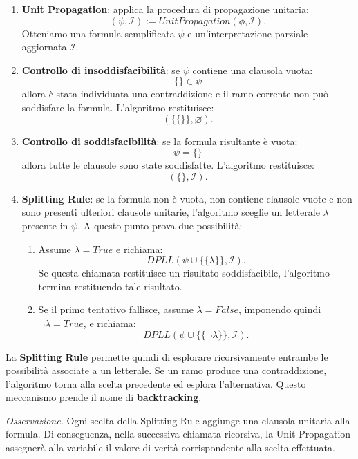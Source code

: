 \begin{enumerate}
    \item \textbf{Unit Propagation}: applica la procedura di propagazione unitaria:
    \[
    (\psi,\mathcal I):=
    UnitPropagation(\phi,\mathcal I).
    \]
    Otteniamo una formula semplificata $\psi$
    e un'interpretazione parziale aggiornata
    $\mathcal I$.

    \item \textbf{Controllo di insoddisfacibilità}: se $\psi$ contiene una clausola vuota:
    \[
    \{\}\in\psi
    \]
    allora è stata individuata una contraddizione
    e il ramo corrente non può soddisfare la formula.
    L'algoritmo restituisce:
    \[
    (\{\{\}\},\varnothing).
    \]
    \item \textbf{Controllo di soddisfacibilità}: se la formula risultante è vuota:
    \[
    \psi=\{\}
    \]
    allora tutte le clausole sono state soddisfatte.
    L'algoritmo restituisce:
    \[
    (\{\},\mathcal I).
    \]
    \item \textbf{Splitting Rule}: se la formula non è vuota, non contiene
    clausole vuote e non sono presenti ulteriori
    clausole unitarie, l'algoritmo sceglie
    un letterale $\lambda$ presente in $\psi$.
    A questo punto prova due possibilità:
    \begin{enumerate}
        \item Assume $\lambda=True$ e richiama:
        \[
        DPLL(\psi\cup\{\{\lambda\}\},\mathcal I).
        \]
        Se questa chiamata restituisce
        un risultato soddisfacibile, l'algoritmo
        termina restituendo tale risultato.
        \item Se il primo tentativo fallisce,
        assume $\lambda=False$, imponendo
        quindi $\neg\lambda=True$, e richiama:
        \[
        DPLL(\psi\cup\{\{\neg\lambda\}\},\mathcal I).
        \]
    \end{enumerate}
\end{enumerate}
La \textbf{Splitting Rule} permette quindi
di esplorare ricorsivamente entrambe le
possibilità associate a un letterale.
Se un ramo produce una contraddizione,
l'algoritmo torna alla scelta precedente
ed esplora l'alternativa.
Questo meccanismo prende il nome di
\textbf{backtracking}.

\smallskip

\noindent \textit{Osservazione.}
Ogni scelta della Splitting Rule aggiunge una
clausola unitaria alla formula.
Di conseguenza, nella successiva chiamata
ricorsiva, la Unit Propagation assegnerà
alla variabile il valore di verità
corrispondente alla scelta effettuata.

